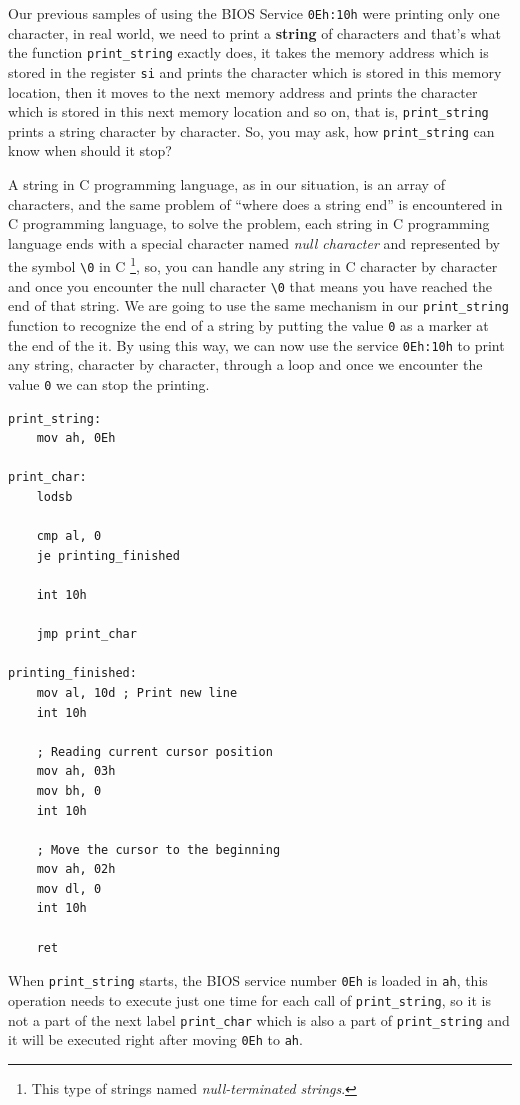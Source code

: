 Our previous samples of using the BIOS Service \lstinline!0Eh:10h! were
printing only one character, in real world, we need to print a
\textbf{string} of characters and that's what the function
\lstinline!print_string! exactly does, it takes the memory address which
is stored in the register \lstinline!si! and prints the character which
is stored in this memory location, then it moves to the next memory
address and prints the character which is stored in this next memory
location and so on, that is, \lstinline!print_string! prints a string
character by character. So, you may ask, how \lstinline!print_string!
can know when should it stop?

A string in C programming language, as in our situation, is an array of
characters, and the same problem of ``where does a string end'' is
encountered in C programming language, to solve the problem, each string
in C programming language ends with a special character named \emph{null
character} and represented by the symbol \lstinline!\0! in C \footnote{This
  type of strings named \emph{null-terminated strings}.}, so, you can
handle any string in C character by character and once you encounter the
null character \lstinline!\0! that means you have reached the end of
that string. We are going to use the same mechanism in our
\lstinline!print_string! function to recognize the end of a string by
putting the value \lstinline!0! as a marker at the end of the it. By
using this way, we can now use the service \lstinline!0Eh:10h! to print
any string, character by character, through a loop and once we encounter
the value \lstinline!0! we can stop the printing.

\begin{lstlisting}
print_string:
    mov ah, 0Eh

print_char:
    lodsb
    
    cmp al, 0
    je printing_finished
    
    int 10h
    
    jmp print_char

printing_finished:
    mov al, 10d ; Print new line
    int 10h
    
    ; Reading current cursor position
    mov ah, 03h
    mov bh, 0
    int 10h
    
    ; Move the cursor to the beginning
    mov ah, 02h
    mov dl, 0
    int 10h

    ret
\end{lstlisting}

When \lstinline!print_string! starts, the BIOS service number
\lstinline!0Eh! is loaded in \lstinline!ah!, this operation needs to
execute just one time for each call of \lstinline!print_string!, so it
is not a part of the next label \lstinline!print_char! which is also a
part of \lstinline!print_string! and it will be executed right after
moving \lstinline!0Eh! to \lstinline!ah!.

